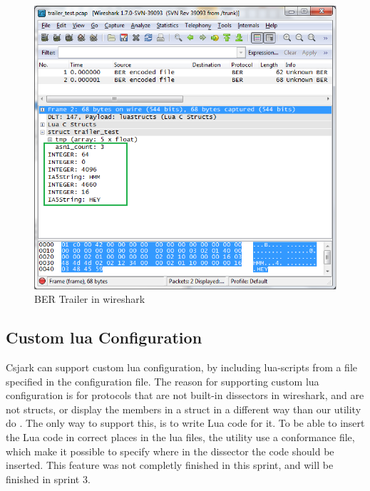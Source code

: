 \begin{figure}[ht]
	\center
	\includegraphics[width=\textwidth]{./sprints/img/wireshark_trailer}
	\caption{BER Trailer in \Gls{wireshark}\label{fig:wstrailer}}
\end{figure}





\subsection{Custom \Gls{lua} Configuration}
Csjark can support custom \Gls{lua} configuration, by including \Gls{lua}-\glspl{script} from a 
file specified in the configuration file. The reason for supporting custom \Gls{lua} 
configuration is for protocols that are not built-in \glspl{dissector} in \Gls{wireshark}, 
and are not \glspl{struct}, or display the members in a struct in a different way 
than our utility do . The only way to support this, is to write Lua code for 
it. To be able to insert the Lua code in correct places in the lua files, the 
utility use a conformance file, which make it possible to specify where in the 
dissector the code should be inserted. This feature was not completly finished 
in this sprint, and will be finished in sprint 3.

